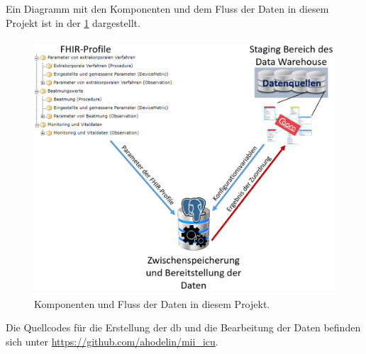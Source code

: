 Ein Diagramm mit den Komponenten und dem Fluss der Daten in diesem Projekt ist in der \ref{fig:components} dargestellt.

\begin{figure}[ht]
	\centering
	\includegraphics[height=9.5cm]{figures/master_diagram}
	\caption[Komponenten und Fluss der Daten] {Komponenten und Fluss der Daten in diesem Projekt.}
	\label{fig:components}
\end{figure}

Die Quellcodes für die Erstellung der \ac{db} und die Bearbeitung der Daten befinden sich unter \href{https://github.com/ahodelin/mii_icu}{https://github.com/ahodelin/mii\_icu}.